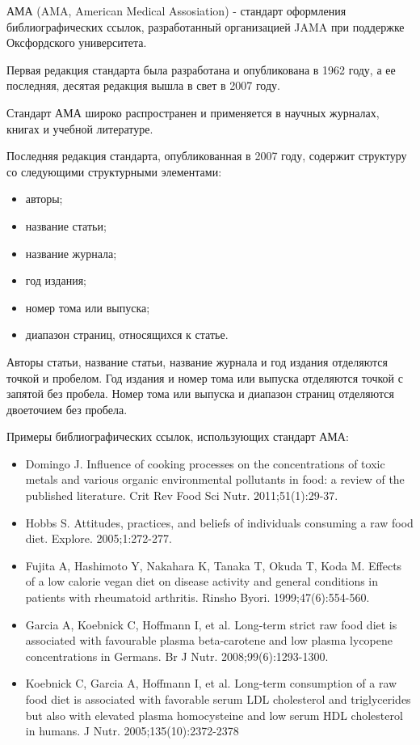 АМА (AMA, American Medical Assosiation) - стандарт оформления библиографических ссылок, разработанный организацией JAMA при поддержке Оксфордского университета.

Первая редакция стандарта была разработана и опубликована в 1962 году, а ее последняя, десятая редакция вышла в свет в 2007 году.

Стандарт АМА широко распространен и применяется в научных журналах, книгах и учебной литературе.

Последняя редакция стандарта, опубликованная в 2007 году, содержит структуру со следующими структурными элементами:
\begin{itemize}
	\item авторы;
	\item название статьи;
	\item название журнала;
	\item год издания;
	\item номер тома или выпуска;
	\item диапазон страниц, относящихся к статье.
\end{itemize}

Авторы статьи, название статьи, название журнала и год издания отделяются точкой и пробелом. Год издания и номер тома или выпуска отделяются точкой с запятой без пробела. Номер тома или выпуска и диапазон страниц отделяются двоеточием без пробела.

Примеры библиографических ссылок, использующих стандарт АМА:
\begin{itemize}
	\item Domingo J. Influence of cooking processes on the concentrations of toxic metals and various organic environmental pollutants in food: a review of the published literature. Crit Rev Food Sci Nutr. 2011;51(1):29-37.
	\item Hobbs S. Attitudes, practices, and beliefs of individuals consuming a raw food diet. Explore. 2005;1:272-277.
	\item Fujita A, Hashimoto Y, Nakahara K, Tanaka T, Okuda T, Koda M. Effects of a low calorie vegan diet on disease activity and general conditions in patients with rheumatoid arthritis. Rinsho Byori. 1999;47(6):554-560.
	\item Garcia A, Koebnick C, Hoffmann I, et al. Long-term strict raw food diet is associated with favourable plasma beta-carotene and low plasma lycopene concentrations in Germans. Br J Nutr. 2008;99(6):1293-1300.
	\item Koebnick C, Garcia A, Hoffmann I, et al. Long-term consumption of a raw food diet is associated with favorable serum LDL cholesterol and triglycerides but also with elevated plasma homocysteine and low serum HDL cholesterol in humans. J Nutr. 2005;135(10):2372-2378
\end{itemize}

